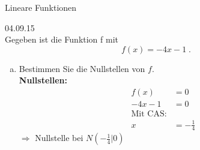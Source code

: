 \documentclass[12pt,fleqn]{article}
\theoremstyle{aufg}
\theoremstyle{bsp}
\begin{document}
 
    \begin{flushleft}
\begin{center}Lineare Funktionen\end{center} 
 04.09.15 \\[2em]Gegeben ist die Funktion f mit\[f(x)=- 4 x - 1\; . \]\begin{enumerate}[a)] 
\item 
Bestimmen Sie die Nullstellen von $f$. \\ 
{\bf Nullstellen:} 
\begin{align*} 
f(x)&=0 \\ 
- 4 x - 1&=0 \\ 
\text{Mit CAS:} \\ 
x&=- \frac{1}{4}\end{align*} 
$\Rightarrow$ Nullstelle bei $N(- \frac{1}{4}|0)$ \\ 


\end{enumerate}
\end{flushleft}
\end{document}
